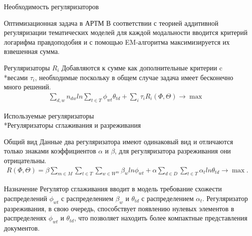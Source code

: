 \documentclass{beamer}
\begin{document}
\begin{frame}{Необходимость регуляризаторов}
\begin{block}{Оптимизационная задача в АРТМ}
	В соответствии с теорией аддитивной регуляризации тематических моделей для каждой модальности вводится критерий логарифма правдоподобия и с помощью EM-алгоритма максимизируется их взвешенная сумма.
    \end{block}
\begin{block}{Регуляризаторы $R_{i}$}
	Добавляются к сумме как дополнительные критерии c \\*весами $\tau_{i}$, необходимые поскольку в общем случае задача имеет бесконечно много решений.
\begin{align*}
	\sum\limits_{d,w} {n_{dw}ln\sum\limits_{t \in T}} {\phi_{wt}\theta_{td}}+\sum\limits_{i}\tau_{i}R_{i}(\Phi,\Theta)\to \max
\end{align*} 
    \end{block}
\end{frame}
\begin{frame}{Используемые регуляризаторы \\*Регуляризаторы сглаживания и разреживания}
\begin{block}{Общий вид}
	Данные два регуляризатора имеют одинаковый вид и отличаются только знаками коэффициентов $\alpha$ и $\beta$, для регуляризатора разреживания они отрицательны.
\begin{align*}
R(\Phi,\Theta)=\beta \sum_{m \in M}\sum_{t \in T}\sum_{w \in W^m} \beta_{w} ln \phi_{wt} + \alpha \sum_{d \in D}\sum_{t \in T}\alpha_{t} ln\theta_{td}\to \max.
\end{align*} 
    \end{block}
\begin{block}{Назначение}
Регулятор сглаживания вводит в модель требование схожести распределений $\phi_{wt}$ с распределением $\beta_{w}$ и $\theta_{td}$ с распределением $\alpha_{t}$. Регуляризатор разреживания, в свою очередь, способствует появлению нулевых элементов в распределенях $\phi_{wt}$ и $\theta_{td}$, что позволяет находить более компактные представления документов.
    \end{block}
\end{frame}
\end{document}
